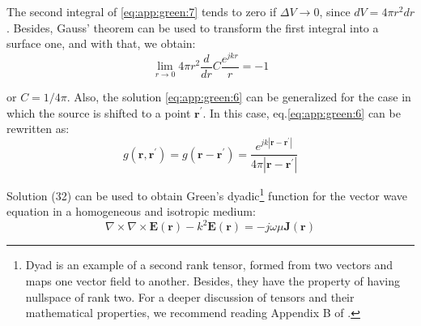    			The second integral of \eqref{eq:app:green:7} tends to zero if $\Delta V \rightarrow 0$, since $dV = 4\pi r^2dr$. Besides, Gauss' theorem can be used to transform the first integral into a surface one, and with that, we obtain:
   			\begin{equation}
   				\lim\limits_{r\rightarrow0} 4\pi r^2\frac{d}{dr}C\frac{e^{jkr}}{r} = -1 \label{eq:app:green:8}
   			\end{equation} 

			\noindent or $C=1/4\pi$. Also, the solution \eqref{eq:app:green:6} can be generalized for the case in which the source is shifted to a point $\mathbf{r^\prime}$. In this case, eq.\eqref{eq:app:green:6} can be rewritten as:
			\begin{equation}
				g(\mathbf{r},\mathbf{r^\prime}) = g(\mathbf{r}-\mathbf{r^\prime}) = \frac{e^{jk|\mathbf{r}-\mathbf{r^\prime}|}}{4\pi |\mathbf{r}-\mathbf{r^\prime}|} \label{eq:app:green:9}
			\end{equation}
	
			Solution (32) can be used to obtain Green's dyadic\footnote{Dyad is an example of a second rank tensor, formed from two vectors and maps one vector field to another. Besides, they have the property of having nullspace of rank two. For a deeper discussion of tensors and their mathematical properties, we recommend reading Appendix B of \citep{chew1995}.} function for the vector wave equation in a homogeneous and isotropic medium:
			\begin{equation}
				\nabla\times\nabla\times\mathbf{E}(\mathbf{r})-k^2\mathbf{E}(\mathbf{r}) = -j\omega\mu\mathbf{J}(\mathbf{r}) \label{eq:app:green:10}
			\end{equation}
	
